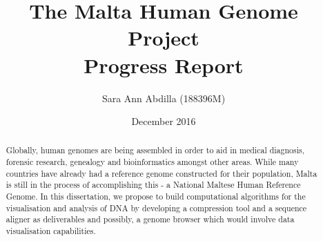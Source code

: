 \documentclass{csfyp}
\title{The Malta Human Genome Project \\
  \large Progress Report}
\author{Sara Ann Abdilla (188396M)}
\date{December 2016}
\begin{document}
\tableofcontents
\newpage

\newpage

\setcounter{page}{1}


\begin{abstract}
Globally, human genomes are being assembled in order to aid in medical diagnosis, forensic research, genealogy and bioinformatics amongst other areas.  While many countries have already had a reference genome constructed for their population, Malta is still in the process of accomplishing this - a National Maltese Human Reference Genome.  In this dissertation, we propose to build computational algorithms for the visualisation and analysis of DNA by developing a compression tool and a sequence aligner as deliverables and possibly, a genome browser which would involve data visualisation capabilities.
{\vspace{-3ex}}
\end{abstract}
\end{document}

